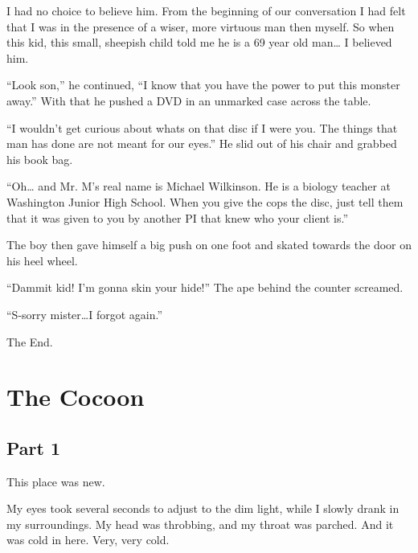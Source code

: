 I had no choice to believe him. From the beginning of our
conversation I had felt that I was in the presence of a wiser, more
virtuous man then myself. So when this kid, this small, sheepish
child told me he is a 69 year old man{\ldots} I believed him.



``Look son,'' he continued, ``I know that you have the power to put
this monster away.'' With that he pushed a DVD in an unmarked case
across the table.



``I wouldn't get curious about whats on that disc if I were you. The
things that man has done are not meant for our eyes.'' He slid out
of his chair and grabbed his book bag.



``Oh{\ldots} and Mr. M's real name is Michael Wilkinson. He is a biology
teacher at Washington Junior High School. When you give the cops
the disc, just tell them that it was given to you by another PI
that knew who your client is.''



The boy then gave himself a big push on one foot and skated towards
the door on his heel wheel.



``Dammit kid! I'm gonna skin your hide!'' The ape behind the counter
screamed.



``S-sorry mister{\ldots}I forgot again.''



The End. 
 





\chapter{The Cocoon}

\section*{Part 1}

This place was new.



My eyes took several seconds to adjust to the dim light, while I
slowly drank in my surroundings. My head was throbbing, and my
throat was parched. And it was cold in here. Very, very cold.



